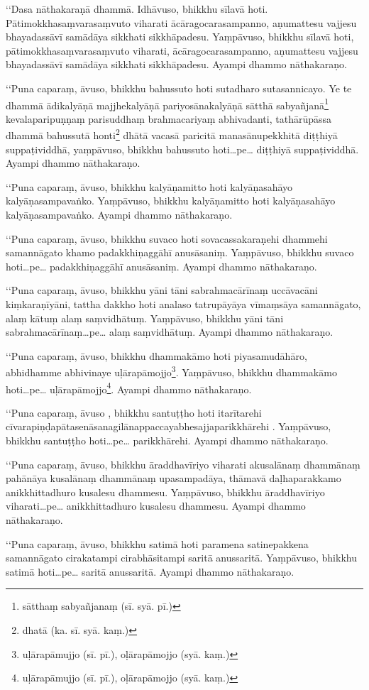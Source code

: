 ‘‘Dasa nāthakaraṇā dhammā. Idhāvuso, bhikkhu sīlavā hoti. Pātimokkhasaṃvarasaṃvuto viharati ācāragocarasampanno, aṇumattesu vajjesu bhayadassāvī samādāya sikkhati sikkhāpadesu. Yaṃpāvuso, bhikkhu sīlavā hoti, pātimokkhasaṃvarasaṃvuto viharati, ācāragocarasampanno, aṇumattesu vajjesu bhayadassāvī samādāya sikkhati sikkhāpadesu. Ayampi dhammo nāthakaraṇo.

‘‘Puna caparaṃ, āvuso, bhikkhu bahussuto hoti sutadharo sutasannicayo. Ye te dhammā ādikalyāṇā majjhekalyāṇā pariyosānakalyāṇā sātthā sabyañjanā\footnote{sātthaṃ sabyañjanaṃ (sī. syā. pī.)} kevalaparipuṇṇaṃ parisuddhaṃ brahmacariyaṃ abhivadanti, tathārūpāssa dhammā bahussutā honti\footnote{dhatā (ka. sī. syā. kaṃ.)} dhātā vacasā paricitā manasānupekkhitā diṭṭhiyā suppaṭividdhā, yaṃpāvuso, bhikkhu bahussuto hoti…pe… diṭṭhiyā suppaṭividdhā. Ayampi dhammo nāthakaraṇo.

‘‘Puna caparaṃ, āvuso, bhikkhu kalyāṇamitto hoti kalyāṇasahāyo kalyāṇasampavaṅko. Yaṃpāvuso, bhikkhu kalyāṇamitto hoti kalyāṇasahāyo kalyāṇasampavaṅko. Ayampi dhammo nāthakaraṇo.

‘‘Puna caparaṃ, āvuso, bhikkhu suvaco hoti sovacassakaraṇehi dhammehi samannāgato khamo padakkhiṇaggāhī anusāsaniṃ. Yaṃpāvuso, bhikkhu suvaco hoti…pe… padakkhiṇaggāhī anusāsaniṃ. Ayampi dhammo nāthakaraṇo.

‘‘Puna caparaṃ, āvuso, bhikkhu yāni tāni sabrahmacārīnaṃ uccāvacāni kiṃkaraṇīyāni, tattha dakkho hoti analaso tatrupāyāya vīmaṃsāya samannāgato, alaṃ kātuṃ alaṃ saṃvidhātuṃ. Yaṃpāvuso, bhikkhu yāni tāni sabrahmacārīnaṃ…pe… alaṃ saṃvidhātuṃ. Ayampi dhammo nāthakaraṇo.

‘‘Puna caparaṃ, āvuso, bhikkhu dhammakāmo hoti piyasamudāhāro, abhidhamme abhivinaye uḷārapāmojjo\footnote{uḷārapāmujjo (sī. pī.), oḷārapāmojjo (syā. kaṃ.)}. Yaṃpāvuso, bhikkhu dhammakāmo hoti…pe… uḷārapāmojjo\footnote{uḷārapāmujjo (sī. pī.), oḷārapāmojjo (syā. kaṃ.)}. Ayampi dhammo nāthakaraṇo.

‘‘Puna caparaṃ, āvuso , bhikkhu santuṭṭho hoti itarītarehi cīvarapiṇḍapātasenāsanagilānappaccayabhesajjaparikkhārehi . Yaṃpāvuso, bhikkhu santuṭṭho hoti…pe… parikkhārehi. Ayampi dhammo nāthakaraṇo.

‘‘Puna caparaṃ, āvuso, bhikkhu āraddhavīriyo viharati akusalānaṃ dhammānaṃ pahānāya kusalānaṃ dhammānaṃ upasampadāya, thāmavā daḷhaparakkamo anikkhittadhuro kusalesu dhammesu. Yaṃpāvuso, bhikkhu āraddhavīriyo viharati…pe… anikkhittadhuro kusalesu dhammesu. Ayampi dhammo nāthakaraṇo.

‘‘Puna caparaṃ, āvuso, bhikkhu satimā hoti paramena satinepakkena samannāgato cirakatampi cirabhāsitampi saritā anussaritā. Yaṃpāvuso, bhikkhu satimā hoti…pe… saritā anussaritā. Ayampi dhammo nāthakaraṇo.

